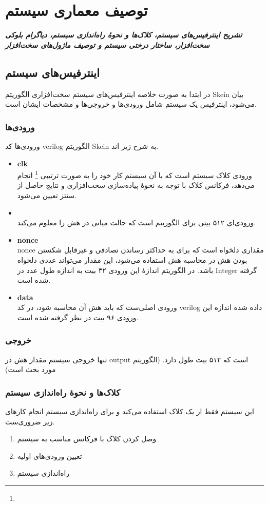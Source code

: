 \chapter{توصیف معماری سیستم}
\noindent
\textbf{
\textit{
تشریح اینترفیس‌های سیستم، کلاک‌ها و نحوهٔ راه‌اندازی سیستم، دیاگرام بلوکی سخت‌افزار، ساختار درختی سیستم و توصیف ماژول‌های سخت‌افزار 
}
}
\pagebreak

\section{ اینترفیس‌های سیستم}
در ابتدا به صورت خلاصه اینترفیس‌های سیستم سخت‌افزاری الگوریتم Skein بیان می‌شود، اینترفیس یک سیستم شامل ورودی‌ها و خروجی‌ها و مشخصات ایشان است. 
\subsection{ورودی‌ها}
ورودی‌ها کد verilog الگوریتم Skein به شرح زیر اند.
\begin{itemize}
\item
\textbf{clk}\\
ورودی کلاک سیستم است که با آن سیستم کار خود را به صورت ترتیبی 
\footnote{}
انجام می‌دهد، فرکانس کلاک با توجه به نحوهٔ پیاده‌سازی سخت‌افزاری و نتایج حاصل از سنتز تعیین می‌شود.
\item
\textbf{}\\
ورودی‌ای ۵۱۲ بیتی برای الگوریتم
  است که حالت میانی در هش را معلوم می‌کند.
\item
\textbf{nonce}\\
nonce مقداری دلخواه است که برای به حداکثر رساندن تصادفی  و غیرقابل شکستن بودن هش 
در محاسبه هش استفاده می‌شود، این مقدار می‌تواند عددی دلخواه باشد. در الگوریتم 
 اندازهٔ این ورودی ۳۲ بیت به اندازه طول عدد در Integer گرفته شده است.
\item
\textbf{data}\\
ورودی اصلی‌ست که باید هش آن محاسبه شود، در کد verilog داده شده اندازه این ورودی ۹۶ بیت در نظر گرفته شده است. 
\end{itemize}

\subsection{خروجی}
تنها خروجی سیستم مقدار هش در output است که ۵۱۲ بیت طول دارد.
(الگوریتم مورد بحث 
 است)

\subsection{کلاک‌ها و نحوهٔ راه‌اندازی سیستم}
این سیستم فقط از یک کلاک استفاده می‌کند و برای راه‌اندازی سیستم انجام کارهای زیر ضروری‌ست.
\begin{enumerate}
\item
وصل کردن کلاک با فرکانس مناسب به سیستم
\item 
تعیین ورودی‌های اولیه 
\item 
راه‌اندازی سیستم 
\end{enumerate}


